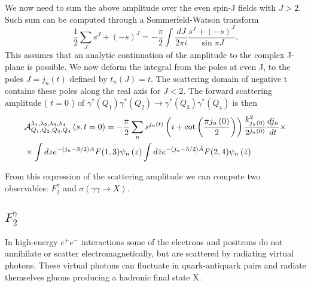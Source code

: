 \documentclass[preprint, 12pt]{elsarticle}
\begin{document}
We now need to sum the above amplitude over the even spin-J fields with $J>2$. Such sum can be computed through a Sommerfeld-Watson transform
\begin{equation}
\frac{1}{2} \sum_J s^J + (-s)^J = -\frac{\pi}{2} \int \frac{dJ}{2 \pi i} \frac{s^J + (-s)^J}{\sin \pi J}.
\end{equation}
This assumes that an analytic continuation of the amplitude to the complex J-plane is possible. We now deform the integral from the poles at even J, to the poles $J = j_n\left(t\right)$ defined by $t_n(J) = t$. The scattering domain of negative t contains these poles along the real axis for $J<2$. The forward scattering amplitude ( $t= 0$ ) of $\gamma^{*}\left(Q_1\right)\gamma^{*}\left(Q_2\right) \rightarrow \gamma^{*}\left(Q_3\right) \gamma^{*}\left(Q_4\right)$ is then
\begin{align}
&\mathcal{A}^{\lambda_1, \lambda_2, \lambda_3, \lambda_4}_{Q_1, Q_2, Q_3, Q_4}\left(s,t = 0\right) = - \frac{\pi}{2} \sum_n s^{j_n\left(t\right)} \left( i + \cot\left(\frac{\pi j_n\left(0\right)}{2}\right) \right) \frac{k_{j_n\left(0\right)}^2}{2^{j_n\left(0\right)}} \frac{d j_n}{dt} \times \notag \\
& \times \int dz e^{-\left(j_n - 3/2\right) A} F(1,3) \psi_n\left(z\right) \int d\bar{z} e^{-(j_n-3/2)\bar{A}} F(2,4) \psi_n\left(\bar{z}\right)
\label{eq:scattering_amplitude}
\end{align}

From this expression of the scattering amplitude we can compute two observables: $F_2^\gamma$ and $\sigma\left(\gamma \gamma \rightarrow X\right)$.
\subsection{$F_2^\gamma$}
In high-energy $e^{+}e^{-}$ interactions some of the electrons and positrons do not annihilate or scatter electromagnetically, but are scattered by radiating virtual photons. These virtual photons can fluctuate in quark-antiquark pairs and radiate themselves gluons producing a hadronic final state X.
\end{document}
